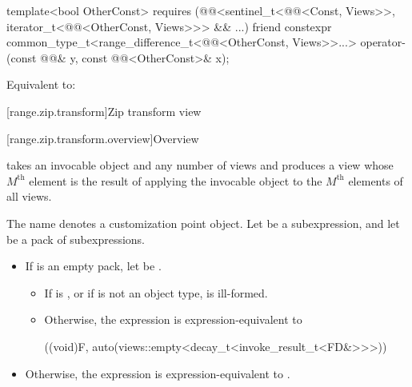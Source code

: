 %
\begin{itemdecl}
template<bool OtherConst>
  requires (@@<sentinel_t<@@<Const, Views>>,
                               iterator_t<@@<OtherConst, Views>>> && ...)
friend constexpr common_type_t<range_difference_t<@@<OtherConst, Views>>...>
  operator-(const @@& y, const @@<OtherConst>& x);
\end{itemdecl}

\begin{itemdescr}
\pnum
\effects
Equivalent to: 
\end{itemdescr}

[range.zip.transform]{Zip transform view}

[range.zip.transform.overview]{Overview}

\pnum
{}%
 takes an invocable object and
any number of views and
produces a view
whose $M^\text{th}$ element is
the result of applying the invocable object
to the $M^\text{th}$ elements of all views.

\pnum
{}%
The name  denotes
a customization point object.
Let  be a subexpression, and
let  be a pack of subexpressions.
\begin{itemize}
\item
If  is an empty pack,
let  be .
\begin{itemize}
\item
If  is , or
if  is not an object type,
 is ill-formed.
\item
Otherwise, the expression 
is expression-equivalent to
\begin{codeblock}
((void)F, auto(views::empty<decay_t<invoke_result_t<FD&>>>))
\end{codeblock}
\end{itemize}
\item
Otherwise, the expression 
is expression-equivalent to .
\end{itemize}

